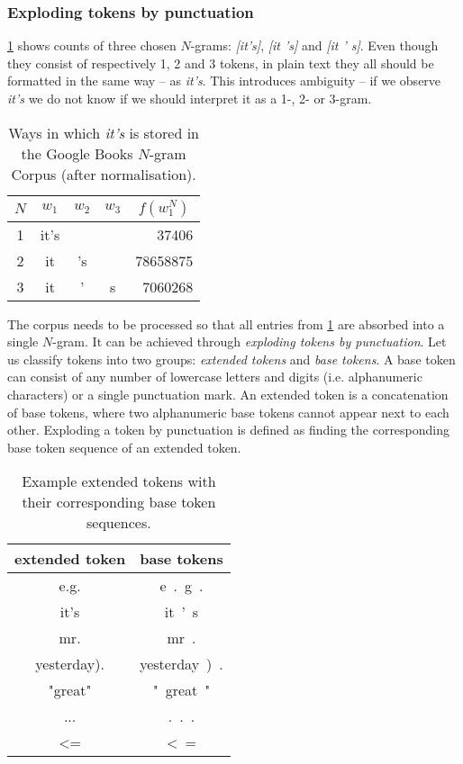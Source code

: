 \documentclass[draft]{IIBproject}
\makeatletter
\DeclareRobustCommand*{\ie}{i.e.\@\xspace}
\DeclareRobustCommand{\ngram}[1]{\emph{[#1]}}
\makeatother
\begin{document}
\subsubsection{Exploding tokens by punctuation}
\label{sec:exploding_tokens}

\cref{tab:its_ngrams} shows counts of three chosen $N$-grams: \ngram{it's}, \ngram{it 's} and \ngram{it ' s}. Even though they consist of respectively 1, 2 and 3 tokens, in plain text they all should be formatted in the same way -- as \emph{it's}. This introduces ambiguity -- if we observe \emph{it's} we do not know if we should interpret it as a 1-, 2- or 3-gram.

\begin{table}[h]
	\centering
	\begin{tabular}{c | c | c | c | r}
	$N$ & $w_1$ & $w_2$ & $w_3$ & \multicolumn{1}{c}{$f(w_1^N)$} \\
	\hline
	1 & it's & & & \num{37406} \\
	2 & it & 's & & \num{78658875} \\
	3 & it & ' & s & \num{7060268}
	\end{tabular}
	\caption{\label{tab:its_ngrams}Ways in which \emph{it's} is stored in the Google Books $N$-gram Corpus (after normalisation).}
\end{table}

The corpus needs to be processed so that all entries from \cref{tab:its_ngrams} are absorbed into a single $N$-gram. It can be achieved through \emph{exploding tokens by punctuation}. Let us classify tokens into two groups: \emph{extended tokens} and \emph{base tokens}. A base token can consist of any number of lowercase letters and digits (\ie alphanumeric characters) or a single punctuation mark. An extended token is a concatenation of base tokens, where two alphanumeric base tokens cannot appear next to each other. Exploding a token by punctuation is defined as finding the corresponding base token sequence of an extended token.

\begin{table}[h]
	\centering
	\begin{tabular}{c | c}
	extended token & base tokens \\
	\hline
	e.g. & e\ .\ g\ . \\
	it's & it\ '\ s \\
	mr. & mr\ . \\
	yesterday). & yesterday\ )\ . \\
	"great" & "\ great\ " \\
	... & .\ .\ . \\
	\textless= & \textless\ =
	\end{tabular}
	\caption{\label{tab:extended_tokens}Example extended tokens with their corresponding base token sequences.}
\end{table}
\end{document}
